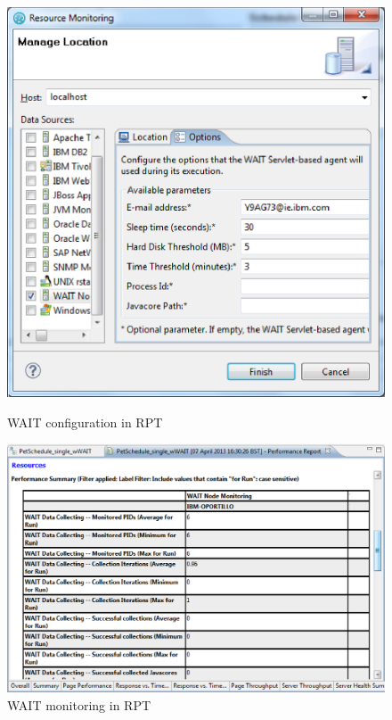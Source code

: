 \documentclass[runningheads,a4paper]{llncs}
\begin{document}
\vspace{-5pt}
\begin{figure}
\centering
\begin{minipage}[b]{.45\textwidth}

\centering
\includegraphics[totalheight=.3\textheight,width=1.0\textwidth]{Smaller_RPT_config}
\caption{WAIT configuration in RPT}
\label{fig_config}

\end{minipage}\qquad
\begin{minipage}[b]{.45\textwidth}

\centering
\includegraphics[totalheight=.3\textheight,width=1.0\textwidth]{Smaller_RPT_monitoring}
\caption{WAIT monitoring in RPT}
\label{fig_mon}

\end{minipage}
\end{figure}
\vspace{-5pt}
\end{document}
